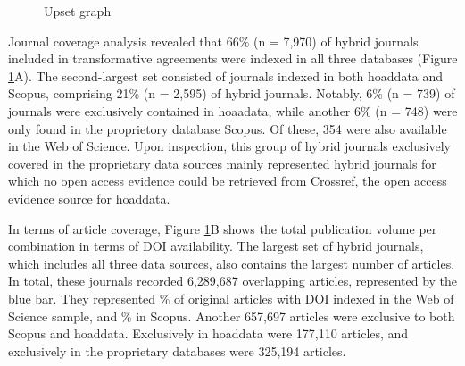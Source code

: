 \documentclass[a4paper,man,floatsintext,longtable,noextraspace,10pt]{apa6}
\begin{document}
\begin{figure}[ht!]


\caption{\label{fig-upset_coverage_results}Upset graph}

\end{figure}%

Journal coverage analysis revealed that 66\% (n = 7,970) of hybrid
journals included in transformative agreements were indexed in all three
databases (Figure \ref{fig-upset_coverage_results}A). The second-largest
set consisted of journals indexed in both hoaddata and Scopus,
comprising 21\% (n = 2,595) of hybrid journals. Notably, 6\% (n = 739)
of journals were exclusively contained in hoaadata, while another 6\% (n
= 748) were only found in the proprietory database Scopus. Of these, 354
were also available in the Web of Science. Upon inspection, this group
of hybrid journals exclusively covered in the proprietary data sources
mainly represented hybrid journals for which no open access evidence
could be retrieved from Crossref, the open access evidence source for
hoaddata.

In terms of article coverage, Figure \ref{fig-upset_coverage_results}B
shows the total publication volume per combination in terms of DOI
availability. The largest set of hybrid journals, which includes all
three data sources, also contains the largest number of articles. In
total, these journals recorded 6,289,687 overlapping articles,
represented by the blue bar. They represented \% of original articles
with DOI indexed in the Web of Science sample, and \% in Scopus. Another
657,697 articles were exclusive to both Scopus and hoaddata. Exclusively
in hoaddata were 177,110 articles, and exclusively in the proprietary
databases were 325,194 articles.
\end{document}

